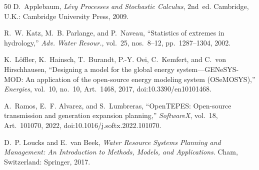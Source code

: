 \documentclass[11pt,a4paper]{article}
\begin{document}
\begin{thebibliography}{50}
 D.~Applebaum, \emph{L\'evy Processes and
Stochastic Calculus}, 2nd~ed. Cambridge, U.K.: Cambridge University Press,
2009.

 R.~W. Katz, M.~B. Parlange, and P.~Naveau, ``Statistics of
extremes in hydrology,'' \emph{Adv. Water Resour.}, vol.~25, nos.~8--12,
pp.~1287--1304, 2002.

 K.~L\"offler, K.~Hainsch, T.~Burandt,
P.-Y. Oei, C.~Kemfert, and C.~von Hirschhausen, ``Designing a model for the
global energy system---GENeSYS-MOD: An application of the open-source energy
modeling system (OSeMOSYS),'' \emph{Energies}, vol.~10, no.~10, Art.~1468,
2017, doi:10.3390/en10101468.

 A.~Ramos, E.~F. Alvarez, and S.~Lumbreras,
``OpenTEPES: Open-source transmission and generation expansion planning,''
\emph{SoftwareX}, vol.~18, Art.~101070, 2022,
doi:10.1016/j.softx.2022.101070.

 D.~P. Loucks and E.~van Beek, \emph{Water Resource Systems
Planning and Management: An Introduction to Methods, Models, and Applications}.
Cham, Switzerland: Springer, 2017.

\end{thebibliography}
\end{document}

